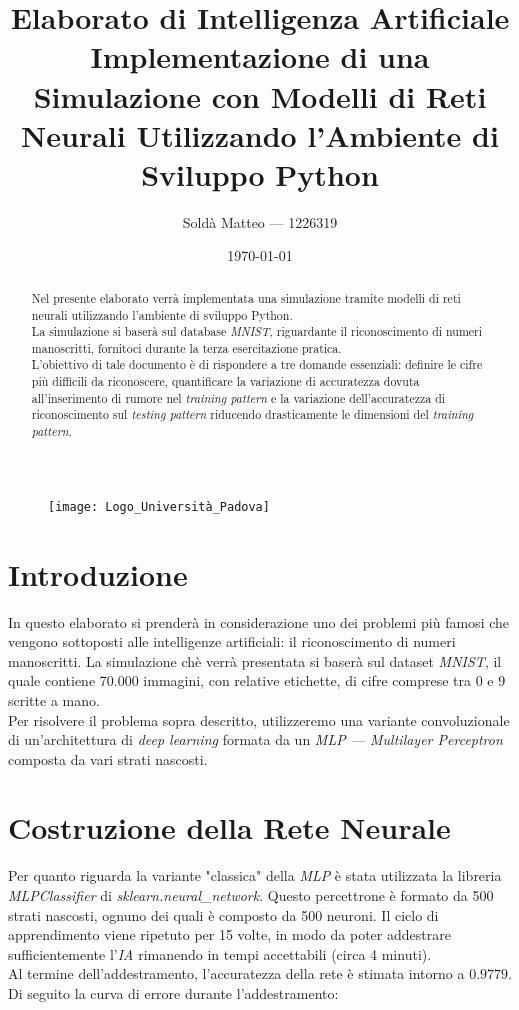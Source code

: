 \documentclass[12pt, a4paper]{article}
\title{\textbf{Elaborato di Intelligenza Artificiale} \\ Implementazione di una Simulazione con Modelli di Reti Neurali Utilizzando l'Ambiente di Sviluppo Python}
\author{Soldà Matteo --- 1226319}
\date{\today}
\begin{document}
\begin{figure}
    \centering
    \texttt{[image: Logo\_Università\_Padova]}
\end{figure}

\maketitle

\newpage
\begin{abstract}
Nel presente elaborato verrà implementata una simulazione tramite modelli di reti neurali utilizzando l'ambiente di sviluppo Python.\\
La simulazione si baserà sul database \textit{MNIST}, riguardante il riconoscimento di numeri manoscritti, fornitoci durante la terza esercitazione pratica.\\
L'obiettivo di tale documento è di rispondere a tre domande essenziali: definire le cifre più difficili da riconoscere, quantificare la variazione di accuratezza dovuta all'inserimento di rumore nel \textit{training pattern} e la variazione dell'accuratezza di riconoscimento sul \textit{testing pattern} riducendo drasticamente le dimensioni del \textit{training pattern}.    
\end{abstract}

\newpage
\tableofcontents

\newpage
\section{Introduzione}
In questo elaborato si prenderà in considerazione uno dei problemi più famosi che vengono sottoposti alle intelligenze artificiali: il riconoscimento di numeri manoscritti.
La simulazione chè verrà presentata si baserà sul dataset \textit{MNIST}, il quale contiene 70.000 immagini, con relative etichette, di cifre comprese tra 0 e 9 scritte a mano.\\
Per risolvere il problema sopra descritto, utilizzeremo una variante convoluzionale di un'architettura di \textit{deep learning} formata da un \textit{MLP --- Multilayer Perceptron} composta da vari strati nascosti.

\newpage
\section{Costruzione della Rete Neurale}
Per quanto riguarda la variante "classica" della \textit{MLP} è stata utilizzata la libreria \textit{MLPClassifier} di \textit{sklearn.neural\_network}. Questo percettrone è formato da 500 strati nascosti, ognuno dei quali è composto da 500 neuroni. Il ciclo di apprendimento viene ripetuto per 15 volte, in modo da poter addestrare sufficientemente l'\textit{IA} rimanendo in tempi accettabili (circa 4 minuti).\\
Al termine dell'addestramento, l'accuratezza della rete è stimata intorno a \(0.9779\). Di seguito la curva di errore durante l'addestramento:
\end{document}
